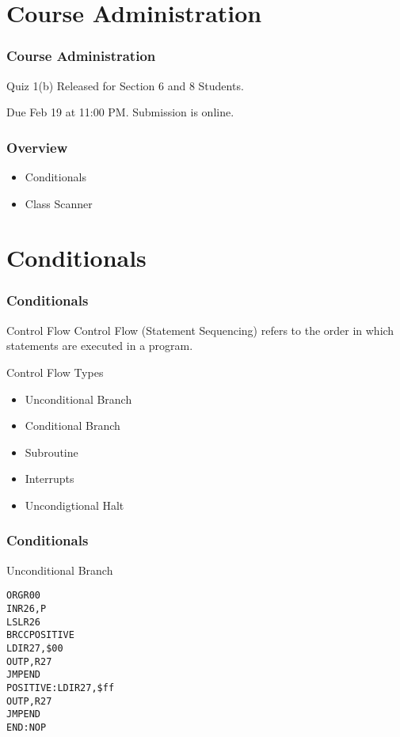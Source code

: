 \documentclass[10pt, compress]{beamer}
\begin{document}
\prepareCover


\section{Course Administration}

\begin{frame}[fragile]
\frametitle{Course Administration}
	Quiz 1(b) Released for Section 6 and 8 Students.

	Due Feb 19 at 11:00 PM. Submission is online.
\end{frame}

\begin{frame}[fragile]
	\frametitle{Overview}
	\begin{itemize}
		\item[] Conditionals
		\item[] Class Scanner
	\end{itemize}
\end{frame}

\section{Conditionals}

\begin{frame}[fragile]
	\frametitle{Conditionals}
	\begin{block}{Control Flow}
		Control Flow (Statement Sequencing) refers to the order in which statements are executed in a program.
	\end{block}
	\begin{block}{Control Flow Types}
		\begin{itemize}
			\item[] Unconditional Branch
			\item[] Conditional Branch
			\item[] Subroutine
			\item[] Interrupts
			\item[] Uncondigtional Halt
		\end{itemize}
	\end{block}
\end{frame}

\begin{frame}[fragile]
	\frametitle{Conditionals}
	\begin{block}{Unconditional Branch}
		\begin{alltt}
						ORG		 R00
						IN			R26, P
						LSL		 R26
						\alert{BRCC}		POSITIVE
						LDI		 R27, \$00
						OUT		 P, R27
						JMP		 END
POSITIVE:	 LDI		 R27, \$ff
						OUT		 P, R27
						JMP		 END
END:				NOP
		\end{alltt}
	\end{block}
\end{frame}
\end{document}
